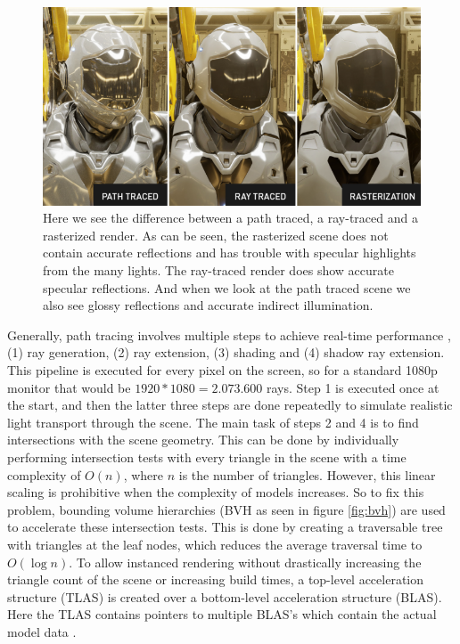 \begin{figure}
    \centering
    \includegraphics[width=\linewidth]{figures/nvidia_ray_path_rasterization.png}
    \caption{Here we see the difference between a path traced, a ray-traced and a rasterized render. As can be seen, the rasterized scene does not contain accurate reflections and has trouble with specular highlights from the many lights. The ray-traced render does show accurate specular reflections. And when we look at the path traced scene we also see glossy reflections and accurate indirect illumination. \cite{NVIDIAPathRayRaster}}
    \label{fig:path_ray_raster}
\end{figure}

Generally, path tracing involves multiple steps to achieve real-time performance \cite{laine2013megakernels}, (1) ray generation, (2) ray extension, (3) shading and (4) shadow ray extension. This pipeline is executed for every pixel on the screen, so for a standard 1080p monitor that would be $1920*1080=2.073.600$ rays. Step 1 is executed once at the start, and then the latter three steps are done repeatedly to simulate realistic light transport through the scene. The main task of steps 2 and 4 is to find intersections with the scene geometry. This can be done by individually performing intersection tests with every triangle in the scene with a time complexity of $O(n)$, where $n$ is the number of triangles. However, this linear scaling is prohibitive when the complexity of models increases. So to fix this problem, bounding volume hierarchies (BVH as seen in figure \ref{fig:bvh}) are used to accelerate these intersection tests. This is done by creating a traversable tree with triangles at the leaf nodes, which reduces the average traversal time to  $O(\log n)$. To allow instanced rendering without drastically increasing the triangle count of the scene or increasing build times, a top-level acceleration structure (TLAS) is created over a bottom-level acceleration structure (BLAS). Here the TLAS contains pointers to multiple BLAS's which contain the actual model data \cite{VulkanAccelerationStructures}.

